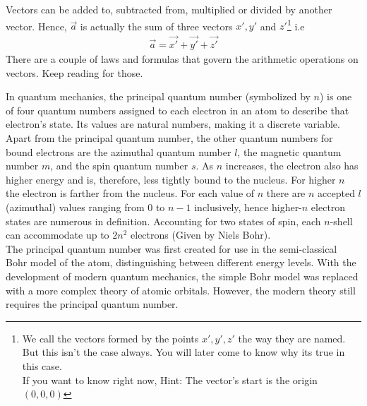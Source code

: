 \begin{phybox}{}
{\begin{center}
\end{center}
Vectors can be added to, subtracted from, multiplied or divided by another vector. Hence, $\Vec{a}$ is actually the sum of three vectors $x', y'$ and $z'$\footnote{We call the vectors formed by the points $x', y', z'$ the way they are named. But this isn't the case always. You will later come to know why its true in this case.\\
If you want to know right now, Hint: The vector's start is the origin $(0,0,0)$ } i.e
\begin{align*}
    \Vec{a} = \Vec{x'} + \Vec{y'} + \Vec{z'}
\end{align*}
There are a couple of laws and formulas that govern the arithmetic operations on vectors. Keep reading for those.}
\end{phybox}
\begin{chembox}{}
{In quantum mechanics, the principal quantum number (symbolized by $n$) is one of four quantum numbers assigned to each electron in an atom to describe that electron's state. Its values are natural numbers, making it a discrete variable.\\
Apart from the principal quantum number, the other quantum numbers for bound electrons are the azimuthal quantum number $l$, the magnetic quantum number $m$, and the spin quantum number $s$.
As $n$ increases, the electron also has higher energy and is, therefore, less tightly bound to the nucleus. For higher $n$ the electron is farther from the nucleus. For each value of $n$ there are $n$ accepted $l$ (azimuthal) values ranging from $0$ to $n - 1$ inclusively, hence higher-$n$ electron states are numerous in definition. Accounting for two states of spin, each $n$-shell can accommodate up to $2n^2$ electrons (Given by Niels Bohr).\\
The principal quantum number was first created for use in the semi-classical Bohr model of the atom, distinguishing between different energy levels. With the development of modern quantum mechanics, the simple Bohr model was replaced with a more complex theory of atomic orbitals. However, the modern theory still requires the principal quantum number.}
\end{chembox}
